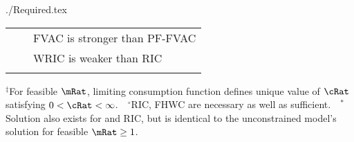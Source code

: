 \documentclass[titlepage,abstract]{bejournal}
\begin{document}
\begin{verbatimwrite}{./Required.tex}
\begin{table}
{\begin{tabular}{|l|l|l|}
\\                                          &                                 & FVAC is stronger than PF-FVAC
\\                                          &                                 & WRIC is weaker than RIC
\\ \hline \multicolumn{3}{c}{}
\end{tabular}
} %

\settowidth\TableWidth{\usebox{\Required}}
\usebox{\Required}

\parbox{\TableWidth}{\footnotesize         $^{\ddagger}$For feasible $\mRat$, limiting consumption function defines unique value of $\cRat$ satisfying $0 < \cRat < \infty$.~~$^{\circ}$RIC, FHWC are necessary as well as sufficient.~~$^{\ast}$Solution also exists for  and RIC, but is identical to the unconstrained model's solution for feasible $\mRat \geq 1$.}

\end{table}

\end{verbatimwrite}


\end{document}
